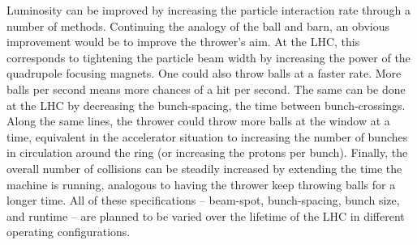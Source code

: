     Luminosity can be improved by increasing the particle interaction rate through a number of methods.
    Continuing the analogy of the ball and barn, an obvious improvement would be to improve the thrower's aim.
    At the LHC, this corresponds to tightening the particle beam width by increasing the power of the quadrupole focusing magnets.
    One could also throw balls at a faster rate.
    More balls per second means more chances of a hit per second.
    The same can be done at the LHC by decreasing the bunch-spacing, the time between bunch-crossings.
    Along the same lines, the thrower could throw more balls at the window at a time,
        equivalent in the accelerator situation to increasing the number of bunches in circulation around the ring
        (or increasing the protons per bunch).
    Finally, the overall number of collisions can be steadily increased by extending the time the machine is running, analogous to having the thrower keep throwing balls for a longer time.
    All of these specifications -- beam-spot, bunch-spacing, bunch size, and runtime -- are planned to be varied over the lifetime of the LHC in different operating configurations.
    
    

